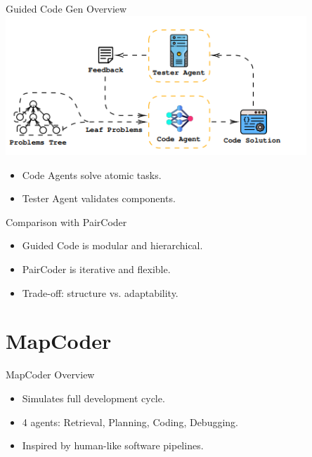 \documentclass{beamer}
\begin{document}
	\begin{frame}{Guided Code Gen Overview}  
	   \includegraphics[width=0.85\textwidth]{codeAgent.png}
	    \begin{itemize}
	   \item Code Agents solve atomic tasks.
	    \item Tester Agent validates components.
	     \end{itemize}
	\end{frame}
	
	\begin{frame}{Comparison with PairCoder}
	  \begin{itemize}
	    \item Guided Code is modular and hierarchical.
	    \item PairCoder is iterative and flexible.
	    \item Trade-off: structure vs. adaptability.
	  \end{itemize}
	\end{frame}
	
	\section{MapCoder}
	\begin{frame}{MapCoder Overview}
	  \begin{itemize}
	    \item Simulates full development cycle.
	    \item 4 agents: Retrieval, Planning, Coding, Debugging.
	    \item Inspired by human-like software pipelines.
	  \end{itemize}
	\end{frame}
	
\end{document}
